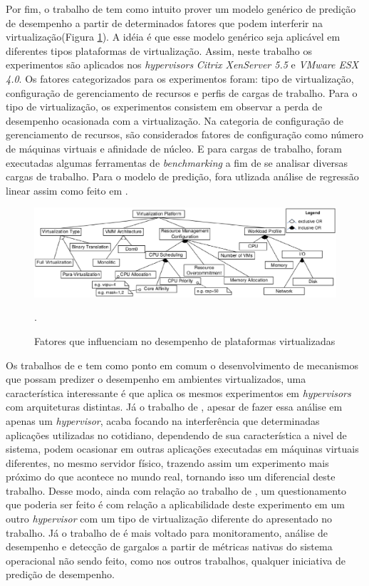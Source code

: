 Por fim, o trabalho de  tem como intuito prover um modelo genérico de predição de desempenho a partir de determinados fatores que podem interferir na virtualização(Figura \ref{influence_factors}). A idéia é que esse modelo genérico seja aplicável em diferentes tipos plataformas de virtualização. Assim, neste trabalho os experimentos são aplicados nos \textit{hypervisors } \textit{Citrix XenServer 5.5} e \textit{VMware ESX 4.0}. Os fatores categorizados para os experimentos foram: tipo de virtualização, configuração de gerenciamento de recursos e perfis de cargas de trabalho. Para o tipo de virtualização, os experimentos consistem em observar a perda de desempenho ocasionada com a virtualização. Na categoria de configuração de gerenciamento de recursos, são considerados fatores de configuração como número de máquinas virtuais e afinidade de núcleo. E para cargas de trabalho, foram executadas algumas ferramentas de \textit{benchmarking} a fim de se analisar diversas cargas de trabalho. Para o modelo de predição, fora utlizada análise de regressão linear assim como feito em . 

\begin{figure}[!htb]
\centering
\includegraphics [keepaspectratio=true,scale=0.40]{figuras/factors_influence.eps}
\caption{Fatores que influenciam no desempenho de plataformas virtualizadas}
\cite{huber2011}.
\label{influence_factors}
\end{figure} 

Os trabalhos de  e  tem como ponto em comum o desenvolvimento de mecanismos que possam predizer o desempenho em ambientes virtualizados, uma característica interessante é que  aplica os mesmos experimentos em \textit{hypervisors} com arquiteturas distintas. Já o trabalho de  , apesar de fazer essa análise em apenas um \textit{hypervisor}, acaba focando na interferência que determinadas aplicações utilizadas no cotidiano, dependendo de sua característica a nivel de sistema, podem ocasionar em outras aplicações executadas em máquinas virtuais diferentes, no mesmo servidor físico,  trazendo assim um experimento mais próximo do que acontece no mundo real, tornando isso um diferencial deste trabalho. Desse modo, ainda com relação ao trabalho de , um questionamento que poderia ser feito é com relação a aplicabilidade deste experimento em um outro \textit{hypervisor} com um tipo de virtualização diferente do apresentado no trabalho. Já o trabalho de  é mais voltado para monitoramento, análise de desempenho e detecção de gargalos a partir de métricas nativas do sistema operacional não sendo feito, como nos outros trabalhos, qualquer iniciativa de predição de desempenho.

